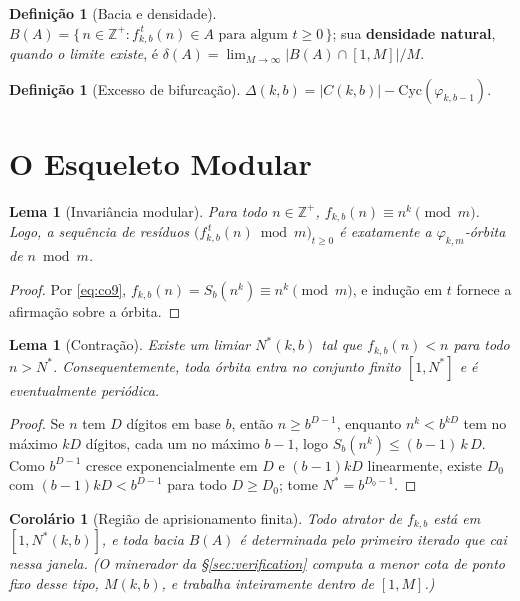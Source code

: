\documentclass[11pt]{article}
\newtheorem{lemma}[theorem]{Lema}
\newtheorem{corollary}[theorem]{Corolário}
\theoremstyle{definition}
\newtheorem{definition}[theorem]{Definição}
\theoremstyle{remark}
\newcommand{\Cyc}{\mathrm{Cyc}}
\begin{document}
\begin{definition}[Bacia e densidade]
$B(A) = \{\, n \in \mathbb{Z}^+ : f_{k,b}^{\,t}(n) \in A \text{ para algum } t \ge 0 \,\}$; sua \textbf{densidade natural}, \emph{quando o limite existe}, é $\delta(A) = \lim_{M\to\infty} |B(A) \cap [1,M]|/M$.
\end{definition}

\begin{definition}[Excesso de bifurcação]
$\Delta(k,b) = |C(k,b)| - \Cyc(\varphi_{k,b-1})$.
\end{definition}

\section{O Esqueleto Modular}

\begin{lemma}[Invariância modular]\label{lem:inv}
Para todo $n \in \mathbb{Z}^+$, $f_{k,b}(n) \equiv n^k \pmod{m}$. Logo, a sequência de resíduos $\big(f_{k,b}^{\,t}(n) \bmod m\big)_{t\ge 0}$ é exatamente a $\varphi_{k,m}$-órbita de $n \bmod m$.
\end{lemma}

\begin{proof}
Por \eqref{eq:co9}, $f_{k,b}(n) = S_b(n^k) \equiv n^k \pmod m$, e indução em $t$ fornece a afirmação sobre a órbita.
\end{proof}

\begin{lemma}[Contração]\label{lem:contraction}
Existe um limiar $N^*(k,b)$ tal que $f_{k,b}(n) < n$ para todo $n > N^*$. Consequentemente, toda órbita entra no conjunto finito $[1, N^*]$ e é eventualmente periódica.
\end{lemma}

\begin{proof}
Se $n$ tem $D$ dígitos em base $b$, então $n \ge b^{D-1}$, enquanto $n^k < b^{kD}$ tem no máximo $kD$ dígitos, cada um no máximo $b-1$, logo $S_b(n^k) \le (b-1)\,k\,D$. Como $b^{D-1}$ cresce exponencialmente em $D$ e $(b-1)kD$ linearmente, existe $D_0$ com $(b-1)kD < b^{D-1}$ para todo $D \ge D_0$; tome $N^* = b^{D_0 - 1}$.
\end{proof}

\begin{corollary}[Região de aprisionamento finita]\label{cor:trap}
Todo atrator de $f_{k,b}$ está em $[1, N^*(k,b)]$, e toda bacia $B(A)$ é determinada pelo primeiro iterado que cai nessa janela. (O minerador da \S\ref{sec:verification} computa a menor cota de ponto fixo desse tipo, $M(k,b)$, e trabalha inteiramente dentro de $[1,M]$.)
\end{corollary}
\end{document}
